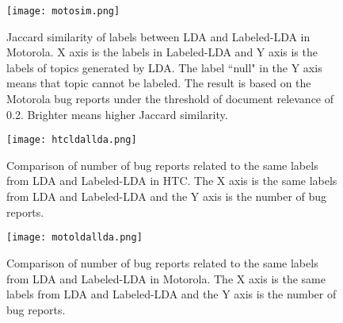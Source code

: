 \documentclass[10pt, conference, compsocconf]{IEEEtran}
\begin{document}
\begin{figure*}[htb]
\centering
\texttt{[image: motosim.png]}
\caption{Jaccard similarity of labels between LDA and Labeled-LDA in Motorola. X axis is the labels in Labeled-LDA and Y axis is the labels of topics generated by LDA. The label ``null" in the Y axis means that topic cannot be labeled. The result is based on the Motorola bug reports under the threshold of document relevance of 0.2. Brighter means higher Jaccard similarity.}
\label{similaritymoto}
\end{figure*}

\begin{figure}[htb]
\centering
\texttt{[image: htcldallda.png]}
\caption{Comparison of number of bug reports related to the same labels from LDA and Labeled-LDA in HTC. The X axis is the same labels from LDA and Labeled-LDA and the Y axis is the number of bug reports.}
\label{bughtc}
\end{figure}

\begin{figure}[!htb]
\centering
\texttt{[image: motoldallda.png]}
\caption{Comparison of number of bug reports related to the same labels from LDA and Labeled-LDA in Motorola. The X axis is the same labels from LDA and Labeled-LDA and the Y axis is the number of bug reports.}
\label{bugmoto}
\end{figure}


\end{document}
